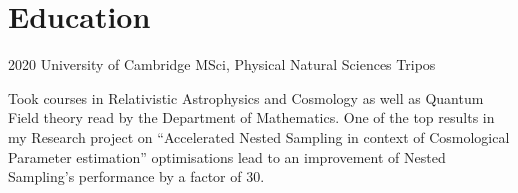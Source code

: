 \documentclass{CurriculumVitae}[10pt, condensed]
\begin{document}
{\begin{comment}
  \job{Jan 2013}{May 2015}  {Masterlagebra.org} {Backend Developer}
  {Designed and implemented problems for university level automated
    linear algebra training program. Problems were related to complex
    numbers, Gram-Schmidt ortho-normalisation process, analytical geometry
    problems involving planes and lines in higher dimensions.
  }
\end{comment}

\begin{comment}
  \section*{Volunteer work} \job{2015}{2017}{Queens' College}
  {Technical director} {I supervised a self-motivated team of
    volunteers to set up and dismantle decorations at the Queens'
    College Fitzpatrick Hall, as well as handle Audio visual equiment
    including but not limited to ROBE colorspots, human sized
    speakers, trusses, stage hydraulics, a laser projector and
    multiple smoke machines.  During QErgs 2016 (which is the largest
    indoors rowing competition in the world), we had a large
    issue. The Ergs (devices which measured the sportspeople's
    performance) were located at the far side of the hall, right under
    the projector screen and opposite the projector. They had to be
    connected to the projector via a CAT6 shielded wire. As it turned
    out, the shielded wire didn't have enough range, and the race
    would have been called off.  I quickly made a skype call with
    desktop sharing to the Wi-Fi connected laptop at the far side. }
\end{comment}

\section*{Education}%

%
          {2020}%
          {University of Cambridge}%
          {MSci, }%
          {Physical Natural Sciences Tripos}%
          {%

            Took courses in Relativistic Astrophysics and Cosmology as
            well as Quantum Field theory read by the Department of
            Mathematics. One of the top results in my Research project
            on ``Accelerated Nested Sampling in context of
            Cosmological Parameter estimation''%
            optimisations lead to an improvement of Nested Sampling's
            performance by a factor of 30.
          }%


}
\end{document}

